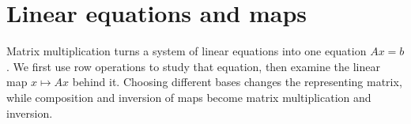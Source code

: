 \chapter{Linear equations and maps}
\label{ch:linear-algebra-i:linear-equations-and-maps}

Matrix multiplication turns a system of linear equations into one equation
\(Ax=b\). We first use row operations to study that equation, then examine
the linear map \(x\mapsto Ax\) behind it. Choosing different bases changes
the representing matrix, while composition and inversion of maps become
matrix multiplication and inversion.




